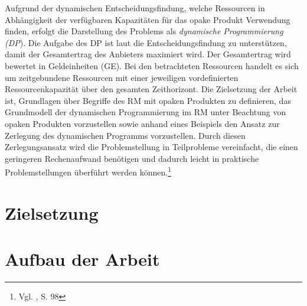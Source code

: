Aufgrund der dynamischen Entscheidungsfindung, welche Ressourcen in Abhängigkeit der verfügbaren Kapazitäten für das opake Produkt %
Verwendung finden, erfolgt die Darstellung des Problems als \textit{dynamische Programmierung (DP}). %
Die Aufgabe des DP ist laut \cite{talluri2004theory} die Entscheidungsfindung zu unterstützen, damit der Gesamtertrag des Anbieters maximiert wird. Der Gesamtertrag wird bewertet in Geldeinheiten (GE). Bei den betrachteten Ressourcen handelt es sich um zeitgebundene Ressourcen mit einer jeweiligen vordefinierten Ressourcenkapazität über den gesamten Zeithorizont. Die Zielsetzung der Arbeit ist, Grundlagen über Begriffe des RM mit opaken Produkten zu definieren, das Grundmodell der dynamischen Programmierung im RM unter Beachtung von opaken Produkten vorzustellen sowie anhand eines Beispiels den Ansatz zur Zerlegung des dynamischen Programms vorzustellen. Durch diesen Zerlegungsansatz wird die Problemstellung in Teilprobleme vereinfacht, die einen geringeren Rechenaufwand benötigen und dadurch leicht in praktische Problemstellungen überführt werden können.\footnote{Vgl. \cite{gonsch2013using}, S. 98}

\section{Zielsetzung}

\section{Aufbau der Arbeit}